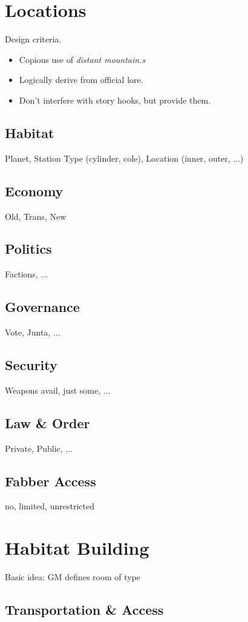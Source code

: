 \documentclass[a4]{article}
\begin{document}
\section{Locations}

Design criteria.

\begin{itemize}
    \item Copious use of \textit{distant mountain.s}
    \item Logically derive from official \eclipsephase lore.
    \item Don't interfere with story hooks, but provide them.
\end{itemize}

\subsection{Habitat} Planet, Station Type (cylinder, cole), Location (inner, outer, ...)
\subsection{Economy} Old, Trans, New
\subsection{Politics} Factions, ...
\subsection{Governance} Vote, Junta, ...
\subsection{Security} Weapons avail, just some, ...
\subsection{Law \& Order} Private, Public, ...
\subsection{Fabber Access} no, limited, unrestricted


\section{Habitat Building}

Basic idea: GM defines room of type



\subsection{Transportation \& Access}
\end{document}
